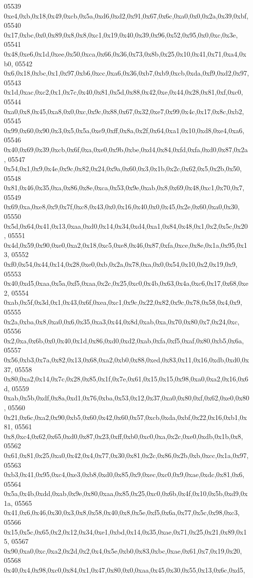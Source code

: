 \begin{DoxyCode}
05539   0xe4,0xb,0x18,0x49,0xcb,0x5a,0xd6,0xd2,0x91,0x67,0x6c,0xa0,0x0,0x2a,0x39,0xbf,
05540   0x17,0xbc,0x0,0x89,0x8,0x8,0xc1,0x19,0x40,0x39,0x96,0x52,0x95,0x0,0xc,0x3e,
05541   0x48,0xe6,0x1d,0xee,0x50,0xca,0x66,0x36,0x73,0x8b,0x25,0x10,0x41,0x71,0xa4,0xb0,
05542   0x6,0x18,0xbc,0x1,0x97,0xb6,0xcc,0xa6,0x36,0xb7,0xb9,0xcb,0xda,0xf9,0xd2,0x97,
05543   0x1d,0xac,0xc2,0x1,0x7c,0x40,0x81,0x5d,0x88,0x42,0xe,0x44,0x28,0x81,0xf,0xc0,
05544   0xa0,0x8,0x45,0xa8,0x0,0xc,0x9c,0x88,0x67,0x32,0xe7,0x99,0x4c,0x17,0x8c,0xb2,
05545   0x99,0x60,0x90,0x3,0x5,0x5a,0xe9,0xff,0x8a,0x2f,0x64,0xa1,0x10,0xd8,0xe4,0xa6,
05546   0x40,0x69,0x39,0xcb,0x6f,0xa,0xe0,0x9b,0xbe,0xd4,0x84,0xfd,0xfa,0xd0,0x87,0x2a,
05547   0x54,0x1,0x9,0x4e,0x9c,0x82,0x24,0x9a,0x60,0x3,0x1b,0x2c,0x62,0x5,0x2b,0x50,
05548   0x81,0x46,0x35,0xa,0x86,0x8e,0xca,0x53,0x9e,0xab,0x8,0x69,0x48,0xc1,0x70,0x7,
05549   0x69,0xa,0xe8,0x9,0x7f,0xc8,0x43,0x0,0x16,0x40,0x0,0x45,0x2e,0x60,0xa0,0x30,
05550   0x5d,0x64,0x41,0x13,0xaa,0xd0,0x14,0x34,0xd4,0xa1,0x84,0x48,0x1,0x2,0x5c,0x20,
05551   0x4d,0x59,0x90,0xe0,0xa2,0x18,0xc5,0xe8,0x46,0x87,0xfa,0xce,0x8e,0x1a,0x95,0x13,
05552   0xf0,0x54,0x44,0x14,0x28,0xe0,0xb,0x2a,0x78,0xa,0x0,0x54,0x10,0x2,0x19,0x9,
05553   0x40,0xd5,0xaa,0x5a,0xf5,0xaa,0x2c,0x25,0xc0,0x4b,0x63,0x4a,0xc6,0x17,0x68,0xe2,
05554   0xab,0x5f,0x3d,0x1,0x43,0x6f,0xea,0xc1,0x9c,0x22,0x82,0x9c,0x78,0x58,0x4,0x9,
05555   0x2a,0xba,0x8,0xa0,0x6,0x35,0xa3,0x44,0x8d,0xab,0xa,0x70,0x80,0x7,0x24,0xc,
05556   0x2,0xa,0x6b,0x0,0x40,0x1d,0x86,0xd0,0xd2,0xab,0xfa,0xf5,0xaf,0x80,0xb5,0x6a,
05557   0x56,0xb3,0x7a,0x82,0x13,0x68,0xa2,0xb0,0x88,0xed,0x83,0x11,0x16,0xdb,0xd0,0x37,
05558   0x80,0xa2,0x14,0x7c,0x28,0x85,0x1f,0x7e,0x61,0x15,0x15,0x98,0xa0,0xa2,0x16,0x6d,
05559   0xab,0x5b,0xdf,0x8a,0xd1,0x76,0xba,0x53,0x12,0x37,0xa0,0x80,0xf,0x62,0xe0,0x80,
05560   0x21,0x6c,0xa2,0x90,0xb5,0x60,0x42,0x60,0x57,0xcb,0xda,0xbf,0x22,0x16,0xb1,0x81,
05561   0x8,0xc4,0x62,0x65,0xd0,0x87,0x23,0xff,0xb0,0xc0,0xa,0x2c,0xe0,0xdb,0x1b,0x8,
05562   0x61,0x81,0x25,0xa0,0x42,0x4,0x77,0x30,0x81,0x2c,0x86,0x2b,0xb,0xcc,0x1a,0x97,
05563   0xb3,0x41,0x95,0xc4,0xe3,0xb8,0xd0,0x85,0x9,0xec,0xc0,0x9,0xae,0xdc,0x81,0x6,
05564   0x5a,0x4b,0xdd,0xab,0x9e,0x80,0xaa,0x85,0x25,0xc0,0x6b,0x4f,0x10,0x5b,0xd9,0x1a,
05565   0x41,0x6,0x46,0x30,0x3,0x8,0x58,0x40,0x8,0x5e,0xf5,0x6a,0x77,0x5c,0x98,0xc3,
05566   0x15,0x5c,0x65,0x2,0x12,0x34,0xe1,0xbd,0x14,0x35,0xae,0x71,0x25,0x21,0x89,0x15,
05567   0x90,0xa0,0xc,0xa2,0x2d,0x2,0x4,0x5e,0xb0,0x83,0xbc,0xae,0x61,0x7,0x19,0x20,
05568   0x40,0x4,0x98,0xc0,0x84,0x1,0x47,0x80,0x0,0xaa,0x45,0x30,0x55,0x13,0x6c,0xd5,

\end{DoxyCode}
